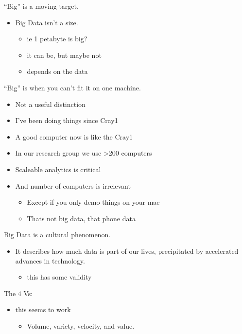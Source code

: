 \documentclass[]{article}
\providecommand{\tightlist}{%
  \setlength{\itemsep}{0pt}\setlength{\parskip}{0pt}}
\begin{document}
``Big'' is a moving target.

\begin{itemize}
\tightlist
\item
  Big Data isn't a size.

  \begin{itemize}
  \tightlist
  \item
    ie 1 petabyte is big?
  \item
    it can be, but maybe not
  \item
    depends on the data
  \end{itemize}
\end{itemize}

``Big'' is when you can't fit it on one machine.

\begin{itemize}
\tightlist
\item
  Not a useful distinction
\item
  I've been doing things since Cray1
\item
  A good computer now is like the Cray1
\item
  In our research group we use \textgreater{}200 computers
\item
  Scaleable analytics is critical
\item
  And number of computers is irrelevant

  \begin{itemize}
  \tightlist
  \item
    Except if you only demo things on your mac
  \item
    Thats not big data, that phone data
  \end{itemize}
\end{itemize}

Big Data is a cultural phenomenon.

\begin{itemize}
\tightlist
\item
  It describes how much data is part of our lives, precipitated by
  accelerated advances in technology.

  \begin{itemize}
  \tightlist
  \item
    this has some validity
  \end{itemize}
\end{itemize}

The 4 Vs:

\begin{itemize}
\tightlist
\item
  this seems to work

  \begin{itemize}
  \tightlist
  \item
    Volume, variety, velocity, and value.
  \end{itemize}
\end{itemize}
\end{document}
